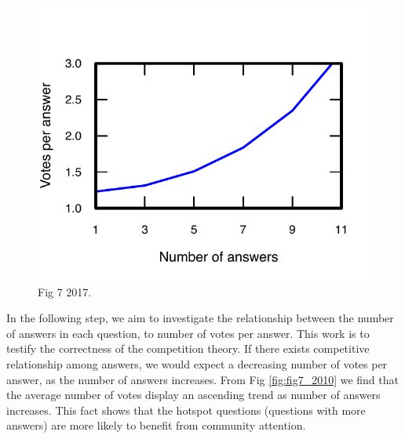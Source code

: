 \begin{figure}[!t]
	\centering
	\includegraphics[width=0.8\columnwidth]{img/Fig7_2017.pdf}
	\caption{Fig 7 2017.}
	\label{fig:fig7_2017}
\end{figure}
In the following step, we aim to investigate the relationship between the number of answers in each question, to number of votes per answer. This work is to testify the correctness of the competition theory. If there exists competitive relationship among answers, we would expect a decreasing number of votes per answer, as the number of answers increases. From Fig \ref{fig:fig7_2010} we find that the average number of votes display an ascending trend as number of answers increases. This fact shows that the hotspot questions (questions with more answers) are more likely to benefit from community attention. 